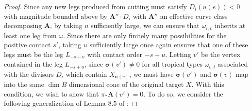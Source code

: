 \documentclass[12pt, oneside]{amsart}   	%
\newcounter{thm}
\newcommand{\NN}{\mathbb{N}}
\newcommand{\vir}{\operatorname{vir}}
\newcommand{\vdim}{\operatorname{vdim}}
\newcommand{\pt}{\operatorname{pt}}
\newcommand{\ev}{\operatorname{ev}}
\newcommand{\out}{\operatorname{out}}
\numberwithin{equation}{section}
\numberwithin{thm}{section}
\numberwithin{figure}{section}
\begin{document}
\begin{proof}
Since any new legs produced from cutting must satisfy $D_i(u(e)) < 0$ with magnitude bounded above by $\textbf{A}''\cdot D_i$ with $\textbf{A}''$ an effective curve class decomposing $\textbf{A}$, by taking $u$ sufficiently large, we can ensure that $\omega_{i,v}$ inherits at least one leg from $\omega$. Since there are only finitely many possibilities for the positive contact $s'$, taking $u$ sufficiently large once again ensures that one of these legs must be the leg $L_{-s+u}$ with contact order $-s+u$. Letting $v'$ be the vertex contained in the leg $L_{-s+u}$, since $\pmb\sigma(v') \not= 0$ for all tropical types $\omega_{v,i}$ associated with the divisors $D_i$ which contain $X_{\pmb\sigma(v)}$, we must have $\pmb\sigma(v')$ and $\pmb\sigma(v)$ map into the same $\dim B$ dimensional cone of the original target $X$. With this condition, we wish to show that $\pi_*\textbf{A}(v') = 0$. To do so, we consider the following generalization of Lemma $8.5$ of \cite{qpint}:






%

%


\end{proof}
\end{document}
